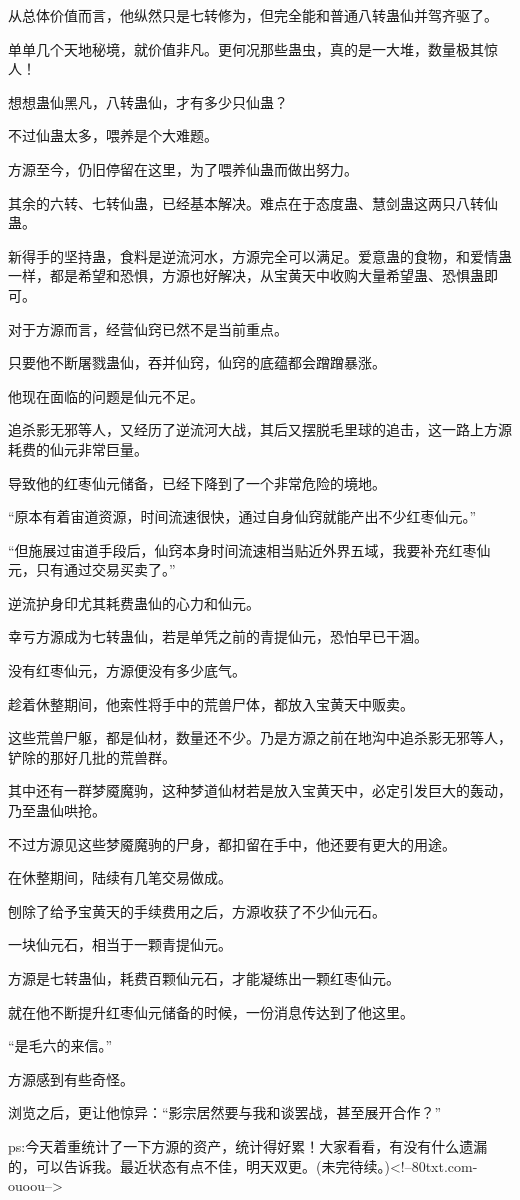 \begin{this_body}
从总体价值而言，他纵然只是七转修为，但完全能和普通八转蛊仙并驾齐驱了。

单单几个天地秘境，就价值非凡。更何况那些蛊虫，真的是一大堆，数量极其惊人！

想想蛊仙黑凡，八转蛊仙，才有多少只仙蛊？

不过仙蛊太多，喂养是个大难题。

方源至今，仍旧停留在这里，为了喂养仙蛊而做出努力。

其余的六转、七转仙蛊，已经基本解决。难点在于态度蛊、慧剑蛊这两只八转仙蛊。

新得手的坚持蛊，食料是逆流河水，方源完全可以满足。爱意蛊的食物，和爱情蛊一样，都是希望和恐惧，方源也好解决，从宝黄天中收购大量希望蛊、恐惧蛊即可。

对于方源而言，经营仙窍已然不是当前重点。

只要他不断屠戮蛊仙，吞并仙窍，仙窍的底蕴都会蹭蹭暴涨。

他现在面临的问题是仙元不足。

追杀影无邪等人，又经历了逆流河大战，其后又摆脱毛里球的追击，这一路上方源耗费的仙元非常巨量。

导致他的红枣仙元储备，已经下降到了一个非常危险的境地。

“原本有着宙道资源，时间流速很快，通过自身仙窍就能产出不少红枣仙元。”

“但施展过宙道手段后，仙窍本身时间流速相当贴近外界五域，我要补充红枣仙元，只有通过交易买卖了。”

逆流护身印尤其耗费蛊仙的心力和仙元。

幸亏方源成为七转蛊仙，若是单凭之前的青提仙元，恐怕早已干涸。

没有红枣仙元，方源便没有多少底气。

趁着休整期间，他索性将手中的荒兽尸体，都放入宝黄天中贩卖。

这些荒兽尸躯，都是仙材，数量还不少。乃是方源之前在地沟中追杀影无邪等人，铲除的那好几批的荒兽群。

其中还有一群梦魇魔驹，这种梦道仙材若是放入宝黄天中，必定引发巨大的轰动，乃至蛊仙哄抢。

不过方源见这些梦魇魔驹的尸身，都扣留在手中，他还要有更大的用途。

在休整期间，陆续有几笔交易做成。

刨除了给予宝黄天的手续费用之后，方源收获了不少仙元石。

一块仙元石，相当于一颗青提仙元。

方源是七转蛊仙，耗费百颗仙元石，才能凝练出一颗红枣仙元。

就在他不断提升红枣仙元储备的时候，一份消息传达到了他这里。

“是毛六的来信。”

方源感到有些奇怪。

浏览之后，更让他惊异：“影宗居然要与我和谈罢战，甚至展开合作？”

ps:今天着重统计了一下方源的资产，统计得好累！大家看看，有没有什么遗漏的，可以告诉我。最近状态有点不佳，明天双更。(未完待续。)<!--80txt.com-ouoou-->

\end{this_body}


